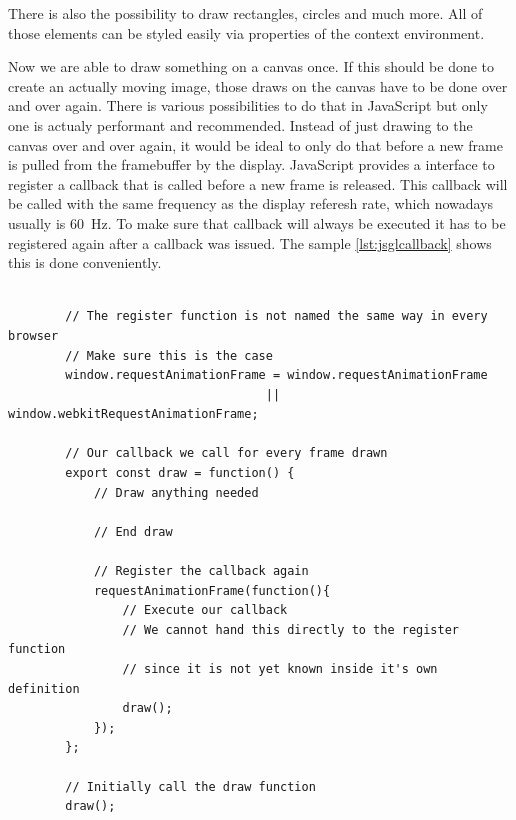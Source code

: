 There is also the possibility to draw rectangles, circles and much more. All of those elements can be styled easily via properties of the context environment.

Now we are able to draw something on a canvas once. If this should be done to create an actually moving image, those draws on the canvas have to be done over and over again. There is various possibilities to do that in JavaScript but only one is actualy performant and recommended. Instead of just drawing to the canvas over and over again, it would be ideal to only do that before a new frame is pulled from the framebuffer by the display. JavaScript provides a interface to register a callback that is called before a new frame is released. This callback will be called with the same frequency as the display referesh rate, which nowadays usually is \SI{60}{\hertz}.
To make sure that callback will always be executed it has to be registered again after a callback was issued. The sample \ref{lst:jsglcallback} shows this is done conveniently.

\begin{tcolorbox}[
        title={
            \refstepcounter{listing}
            Listing \thelisting: JavaScript ``Get 2D Rendering Context''
            \label{lst:js2dcontext}
            \addcontentsline{lol}{listing}{\protect\numberline{\thelisting}}
        }
    ]
    \begin{verbatim}

        // The register function is not named the same way in every browser
        // Make sure this is the case
        window.requestAnimationFrame = window.requestAnimationFrame
                                    || window.webkitRequestAnimationFrame;

        // Our callback we call for every frame drawn
        export const draw = function() {
            // Draw anything needed

            // End draw

            // Register the callback again
            requestAnimationFrame(function(){
                // Execute our callback
                // We cannot hand this directly to the register function
                // since it is not yet known inside it's own definition
                draw();
            });
        };

        // Initially call the draw function
        draw();
    \end{verbatim}
\end{tcolorbox}

